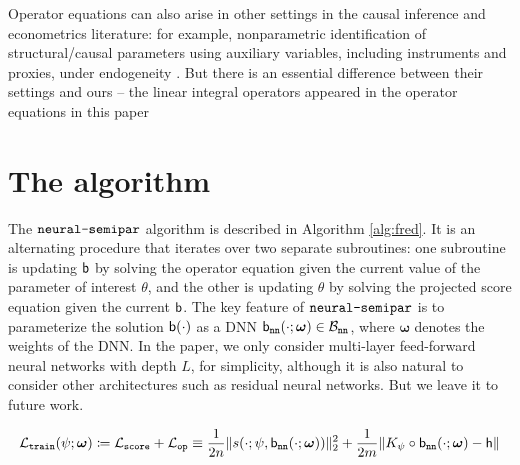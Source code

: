 \documentclass[11pt]{article}
\def\neurosemi{{\normalfont\texttt{neural-semipar}}}
\def\train{\texttt{train}}
\def\op{\texttt{op}}
\def\nn{\texttt{nn}}
\def\score{\texttt{score}}
\begin{document}
\begin{remark}
\label{rem:proximal}
Operator equations can also arise in other settings in the causal inference and econometrics literature: for example, nonparametric identification of structural/causal parameters using auxiliary variables, including instruments and proxies, under endogeneity  \citep{newey2003instrumental, tchetgen2020introduction, breunig2021adaptive}. But there is an essential difference between their settings and ours -- the linear integral operators appeared in the operator equations in this paper
\end{remark}

\section{The algorithm}
\label{sec:fred}

The $\neurosemi$ algorithm is described in Algorithm \ref{alg:fred}. It is an alternating procedure that iterates over two separate subroutines: one subroutine is updating ${\mathsf{b}}$ by solving the operator equation given the current value of the parameter of interest $\theta$, and the other is updating $\theta$ by solving the projected score equation given the current ${\mathsf{b}}$. The key feature of $\neurosemi$ is to parameterize the solution ${\mathsf{b}} (\cdot)$ as a DNN $\sfb_{\nn} (\cdot; \bm{\omega}) \in \calB_{\nn}$, where $\bm{\omega}$ denotes the weights of the DNN. In the paper, we only consider multi-layer feed-forward neural networks with depth $L$, for simplicity, although it is also natural to consider other architectures such as residual neural networks. But we leave it to future work.

\begin{equation*}
\calL_{\train} (\psi; \bm{\omega}) \coloneqq \calL_{\score} + \calL_{\op} \equiv \frac{1}{2 n} \Vert s (\cdot; \psi, \sfb_{\nn} (\cdot; \bm{\omega})) \Vert_{2}^{2} + \frac{1}{2 m} \Vert K_{\psi} \circ \sfb_{\nn} (\cdot; \bm{\omega}) - \sfh \Vert
\end{equation*}
\end{document}
